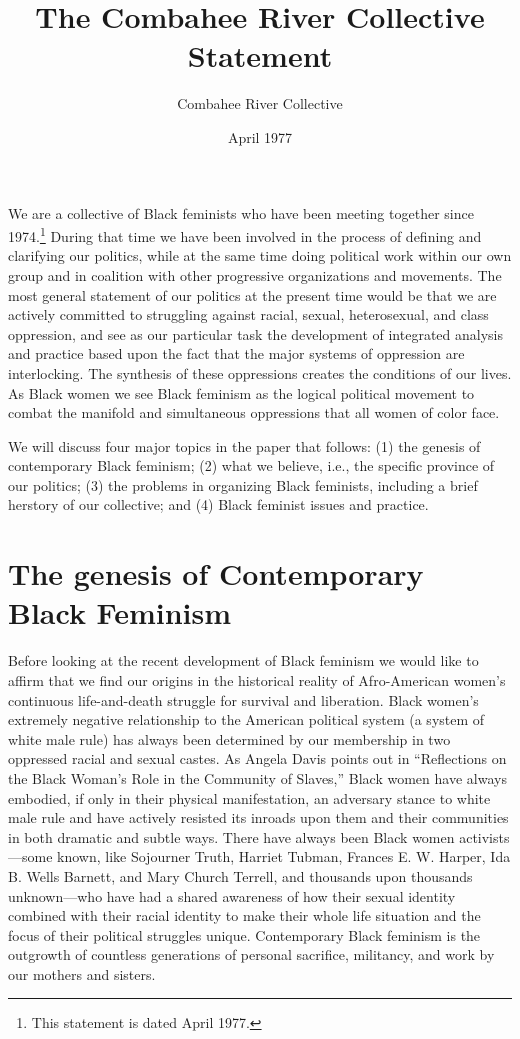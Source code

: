 \documentclass{article}
\title{The Combahee River Collective Statement}
\author{Combahee River Collective}
\date{April 1977}
\begin{document}
\maketitle

We are a collective of Black feminists who have been meeting together since
1974.\footnote{This statement is dated April 1977.} During that time we have
been involved in the process of defining and clarifying our politics, while at
the same time doing political work within our own group and in coalition with
other progressive organizations and movements.  The most general statement of
our politics at the present time would be that we are actively committed to
struggling against racial, sexual, heterosexual, and class oppression, and see
as our particular task the development of integrated analysis and practice
based upon the fact that the major systems of oppression are interlocking. The
synthesis of these oppressions creates the conditions of our lives. As Black
women we see Black feminism as the logical political movement to combat the
manifold and simultaneous oppressions that all women of color face.

We will discuss four major topics in the paper that follows: (1) the genesis of
contemporary Black feminism; (2) what we believe, i.e., the specific province
of our politics; (3) the problems in organizing Black feminists, including a
brief herstory of our collective; and (4) Black feminist issues and practice.

\section{The genesis of Contemporary Black Feminism}

Before looking at the recent development of Black feminism we would like to
affirm that we find our origins in the historical reality of Afro-American
women's continuous life-and-death struggle for survival and liberation. Black
women's extremely negative relationship to the American political system (a
system of white male rule) has always been determined by our membership in two
oppressed racial and sexual castes. As Angela Davis points out in ``Reflections
on the Black Woman's Role in the Community of Slaves,'' Black women have always
embodied, if only in their physical manifestation, an adversary stance to white
male rule and have actively resisted its inroads upon them and their
communities in both dramatic and subtle ways. There have always been Black
women activists—some known, like Sojourner Truth, Harriet Tubman, Frances E. W.
Harper, Ida B. Wells Barnett, and Mary Church Terrell, and thousands upon
thousands unknown—who have had a shared awareness of how their sexual identity
combined with their racial identity to make their whole life situation and the
focus of their political struggles unique. Contemporary Black feminism is the
outgrowth of countless generations of personal sacrifice, militancy, and work
by our mothers and sisters.
\end{document}
